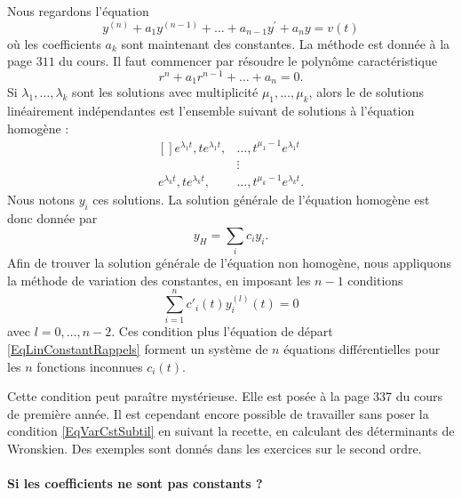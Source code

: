 Nous regardons l'équation
\begin{equation}	\label{EqLinConstantRappels}
	y^{(n)} + a_1 y^{(n-1)} + \ldots + a_{n-1} y^\prime + a_n y = v(t)
\end{equation}
où les coefficients $a_k$ sont maintenant des constantes. La méthode est donnée à la page $311$ du cours. Il faut commencer par résoudre le polynôme caractéristique
\begin{equation}
	r^n+a_1 r^{n-1}+\ldots +a_n=0.
\end{equation}
Si $\lambda_1,\ldots,\lambda_k$ sont les solutions avec multiplicité $\mu_1,\ldots,\mu_k$, alors le  de solutions linéairement indépendantes est l'ensemble suivant de solutions à l'équation homogène :
\begin{equation}
	\begin{aligned}[]
		 e^{\lambda_1 t},t e^{\lambda_1 t},	&	\ldots,t^{\mu_1-1} e^{\lambda_1  t}\\
							&\vdots\\
		 e^{\lambda_k t},t e^{\lambda_k t},	&\ldots,t^{\mu_k-1} e^{\lambda_k  t}.
	\end{aligned}
\end{equation}
Nous notons $y_i$ ces solutions. La solution générale de l'équation homogène est donc donnée par
\begin{equation}
	y_H=\sum_i c_i y_i.
\end{equation}
Afin de trouver la solution générale de l'équation non homogène, nous appliquons la méthode de variation des constantes, en imposant les $n-1$ conditions
\begin{equation}		\label{EqVarCstSubtil}
	\sum_{i=1}^n c'_i(t)y_i^{(l)}(t)=0
\end{equation}
avec $l=0,\ldots,n-2$. Ces condition plus l'équation de départ \eqref{EqLinConstantRappels} forment un système de $n$ équations différentielles pour les $n$ fonctions inconnues $c_i(t)$.

Cette condition peut paraître mystérieuse. Elle est posée à la page 337 du cours de première année. Il est cependant encore possible de travailler sans poser la condition \eqref{EqVarCstSubtil} en suivant la recette, en calculant des déterminants de Wronskien. Des exemples sont donnés dans les exercices sur le second ordre.


\paragraph{Si les coefficients ne sont pas constants ?}

